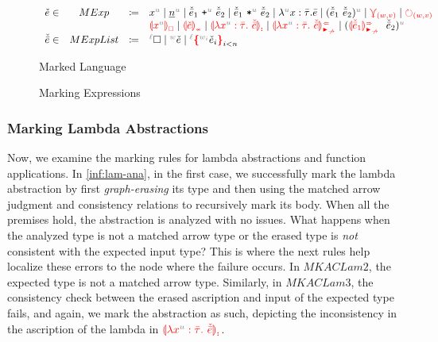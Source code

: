 \begin{figure}
    \[
    \begin{array}{lclll}
    \ECMV \in & MExp & \coloneqq &
        \var{x}
        \mid \num
        \mid \plus{\ELMV_1}{\ELMV_2}
        \mid \mult{\ELMV_1}{\ELMV_2}
        \mid \lam{x}{\TLMV}{\ELV}
        \mid \app{\ELMV_1}{\ELMV_2}
        \mid \multiref
        \mid \uniref \\ 
        & & & \ECFree{\var{x}} 
        \mid \incontype
        \mid \lamasc
        \mid \lamanamarr
        \mid \apsynmarr \\ 
     \ELMV \in & MExpList & \coloneqq &
        \ehole
        \mid \lexp{\ECMV}
        \mid \conflict{\ECMV} \\
    \end{array}
    \]
    \centering
    \caption{Marked Language}
    \label{fig:marked-language}
\end{figure}

\begin{figure}
    \judgbox{\synMarkConstraint{\ctx}{\EMV}{\ECMV}{\sigma}{\cConstraint}{\mConstraint}} 
    \judgbox{\synMarkConstraint{\ctx}{\ELV}{\ELMV}{\sigma}{\cConstraint}{\mConstraint}} 
    \judgbox{\anaMarkConstraint{\ctx}{\EMV}{\ECMV}{\sigma}{\cConstraint}{\mConstraint}} 
    \judgbox{\anaMarkConstraint{\ctx}{\ELV}{\ELMV}{\sigma}{\cConstraint}{\mConstraint}} 
    \centering
    \caption{Marking Expressions}
    \label{fig:marking-judgments}
\end{figure}

\subsubsection{Marking Lambda Abstractions}
\label{sub:mark-lam}
Now, we examine the marking rules for lambda abstractions and function applications. In \autoref{inf:lam-ana}, in the first case, we successfully mark the lambda abstraction by first \emph{graph-erasing} its type and then using the matched arrow judgment and consistency relations to recursively mark its body. When all the premises hold, the abstraction is analyzed with no issues. What happens when the analyzed type is not a matched arrow type or the erased type is \emph{not} consistent with the expected input type? This is where the next rules help localize these errors to the node where the failure occurs. In $MKACLam2$, the expected type is not a matched arrow type. Similarly, in $MKACLam3$, the consistency check between the erased ascription and input of the expected type fails, and again, we mark the abstraction as such, depicting the inconsistency in the ascription of the lambda in $\ECLamInconAsc{\var{x}}{\TLMV}{\ELMV}$.

